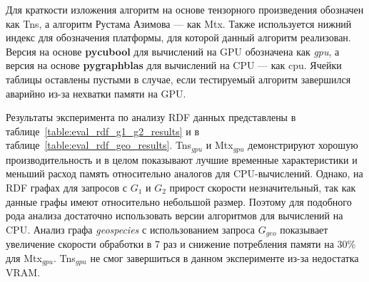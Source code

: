 Для краткости изложения алгоритм на основе тензорного произведения обозначен как Tns, а алгоритм Рустама Азимова --- как Mtx.
Также используется нижний индекс для обозначения платформы, для которой данный алгоритм реализован.
Версия на основе \textbf{pycubool} для вычислений на GPU обозначена как \textit{gpu}, а версия на основе \textbf{pygraphblas} для вычислений на CPU  --- как \textit{}{cpu}. Ячейки таблицы оставлены пустыми в случае, если тестируемый алгоритм завершился аварийно из-за нехватки памяти на GPU. 

Результаты эксперимента по анализу RDF данных представлены в таблице~\ref{table:eval_rdf_g1_g2_results} и в таблице~\ref{table:eval_rdf_geo_results}. 
Tns$_{gpu}$ и Mtx$_{gpu}$ демонстрируют хорошую производительность и в целом показывают лучшие временные характеристики и меньший расход память относительно аналогов для CPU-вычислений. 
Однако, на RDF графах для запросов с $G_1$ и $G_2$ прирост скорости незначительный, 
так как данные графы имеют относительно небольшой размер.
Поэтому для подобного рода анализа достаточно использовать версии алгоритмов для вычислений на CPU. 
Анализ графа \textit{geospecies} с использованием запроса $G_{geo}$ показывает увеличение скорости обработки в 7 раз и снижение потребления памяти на 30\% для Mtx$_{gpu}$. 
Tns$_{gpu}$ не смог завершиться в данном эксперименте из-за недостатка VRAM.

